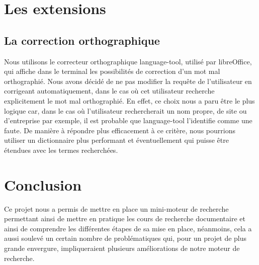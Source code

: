 \documentclass[a4paper,10pt]{report}
\begin{document}
\section{Les extensions}

\subsection{La correction orthographique}

Nous utilisons le correcteur orthographique language-tool, utilis\'e par libreOffice, qui affiche dans le terminal les possibilit\'es de correction d'un mot mal orthographi\'e. Nous avons d\'ecid\'e de ne pas modifier la requ\^ete de l'utilisateur en corrigeant automatiquement, dans le cas o\`u cet utilisateur recherche explicitement le mot mal orthographi\'e. En effet, ce choix nous a paru être le plus logique car, dans le cas où l'utilisateur rechercherait un nom propre, de site ou d'entreprise par exemple, il est probable que language-tool l'identifie comme une faute. De manière à répondre plus efficacement à ce critère, nous pourrions utiliser un dictionnaire plus performant et éventuellement qui puisse être étendues avec les termes recherchées.

\section{Conclusion}

Ce projet nous a permis de mettre en place un mini-moteur de recherche permettant ainsi de mettre en pratique les cours de recherche documentaire et ainsi de comprendre les différentes étapes de sa mise en place, néanmoins, cela a aussi soulevé un certain nombre de problématiques qui, pour un projet de plus grande envergure, impliqueraient plusieurs améliorations de notre moteur de recherche.
\end{document}
